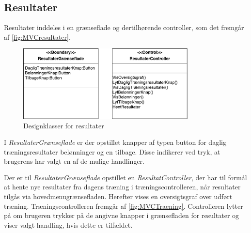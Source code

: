 \subsection*{Resultater}
Resultater inddeles i en grænseflade og dertilhørende controller, som det fremgår af \autoref{fig:MVCresultater}. 

\begin{figure} [H]
\centering
\includegraphics[width=0.8\textwidth]{figures/MVC/Resultater}
\caption{Designklasser for resultater}
\label{fig:MVCresultater}
\end{figure}

\noindent
I \textit{ResultaterGrænseflade} er der opstillet knapper af typen button for daglig træningsresultater belønninger og en tilbage. Disse indikerer ved tryk, at brugerens har valgt en af de mulige handlinger. 
 
Der er til \textit{ResultaterGrænseflade} opstillet en \textit{ResultatController}, der har til formål at hente nye resultater fra dagens træning i træningscontrolleren, når resultater tilgås via hovedmenugrænsefladen. Herefter vises en oversigtsgraf over udført træning. Træningscontrolleren fremgår af \autoref{fig:MVCTraening}.
Controlleren lytter på om brugeren trykker på de angivne knapper i grænsefladen for resultater og viser valgt handling, hvis dette er tilfældet. 
